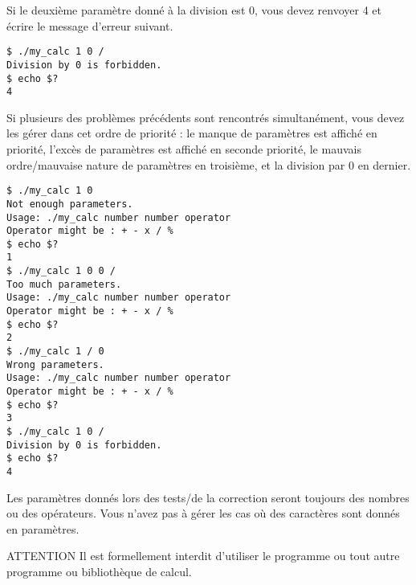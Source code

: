\noindent Si le deuxième paramètre donné à la division est 0, vous devez renvoyer 4 et écrire le message d'erreur suivant.

\bigskip

\noindent {}

\bigskip

\lstset{language=sh}
\begin{lstlisting}[frame=single,title={Cas d'erreur 4 : division par 0}]
$ ./my_calc 1 0 /
Division by 0 is forbidden.
$ echo $?
4
\end{lstlisting}

\bigskip

\noindent Si plusieurs des problèmes précédents sont rencontrés simultanément, vous devez les gérer dans cet ordre de priorité : le manque de paramètres est affiché en priorité, l'excès de paramètres est affiché en seconde priorité, le mauvais ordre/mauvaise nature de paramètres en troisième, et la division par 0 en dernier.

\bigskip

\lstset{language=sh}
\begin{lstlisting}[frame=single,title={Cas d'erreurs : ordre des erreurs}]
$ ./my_calc 1 0
Not enough parameters.
Usage: ./my_calc number number operator
Operator might be : + - x / %
$ echo $?
1
$ ./my_calc 1 0 0 /
Too much parameters.
Usage: ./my_calc number number operator
Operator might be : + - x / %
$ echo $?
2
$ ./my_calc 1 / 0
Wrong parameters.
Usage: ./my_calc number number operator
Operator might be : + - x / %
$ echo $?
3
$ ./my_calc 1 0 /
Division by 0 is forbidden.
$ echo $?
4
\end{lstlisting}

\bigskip

\noindent Les paramètres donnés lors des tests/de la correction seront toujours des nombres ou des opérateurs.
Vous n'avez pas à gérer les cas où des caractères sont donnés en paramètres.

\bigskip

\begin{RedBoxTitle}{ATTENTION}
    Il est formellement interdit d'utiliser le programme  ou tout autre programme ou bibliothèque de calcul.
\end{RedBoxTitle}